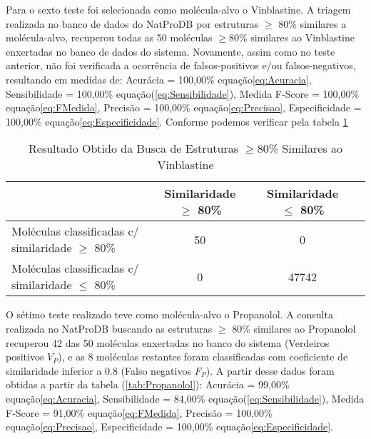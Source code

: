 Para o sexto teste foi selecionada como molécula-alvo o Vinblastine. A triagem realizada no banco de dados do NatProDB por estruturas $\geq$ 80\% similares a molécula-alvo, recuperou todas as 50 moléculas $\geq$80\% similares ao Vinblastine enxertadas no banco de dados do sistema. Novamente, assim como no teste anterior, não foi verificada a ocorrência de falsos-positivos e/ou falsos-negativos, resultando em medidas de: Acurácia = 100,00\% equação\eqref{eq:Acuracia}, Sensibilidade = 100,00\% equação(\ref{eq:Sensibilidade}), Medida F-Score = 100,00\% equação\eqref{eq:FMedida}, Precisão = 100,00\% equação\eqref{eq:Precisao},  Especificidade = 100,00\% equação\eqref{eq:Especificidade}. Conforme podemos verificar pela tabela \ref{tab:Vinblastine}

 \begin{table}[!htb]
	\centering
	\footnotesize
	\caption[Resultado Obtido da Busca de Estruturas $\geq$ 80\% Similares ao Vinblastine]{Resultado Obtido da Busca de Estruturas $\geq$80\% Similares ao Vinblastine}
	\label{tab:Vinblastine}	
	\begin{tabular}{p{4cm}ccc}
		\hline \SPACE
		\textbf{}&\textbf{Similaridade $\geq $ 80\%} & \textbf{Similaridade $\leq $ 80\%} \\ \hline \SPACE
	Moléculas classificadas c/ similaridade $\geq $ 80\%  &	50 & 0 \\ \hline \SPACE
	Moléculas classificadas c/ similaridade $\leq $ 80\%  & 0 & 47742\\ \hline 
	\end{tabular}
\end{table}

\newpage
O sétimo teste realizado teve como molécula-alvo o Propanolol. A consulta realizada no NatProDB buscando as estruturas $\geq$ 80\% similares ao Propanolol recuperou 42 das 50 moléculas enxertadas no banco do sistema (Verdeiros positivos $V_P$), e as 8 moléculas restantes foram classificadas com coeficiente de similaridade inferior a 0.8 (Falso negativos $F_P$). A partir desse dados foram obtidas a partir da tabela (\ref{tab:Propanolol}): Acurácia = 99,00\% equação\eqref{eq:Acuracia}, Sensibilidade = 84,00\%  equação(\ref{eq:Sensibilidade}), Medida F-Score = 91,00\% equação\eqref{eq:FMedida}, Precisão = 100,00\% equação\eqref{eq:Precisao},  Especificidade = 100,00\% equação\eqref{eq:Especificidade}.  

